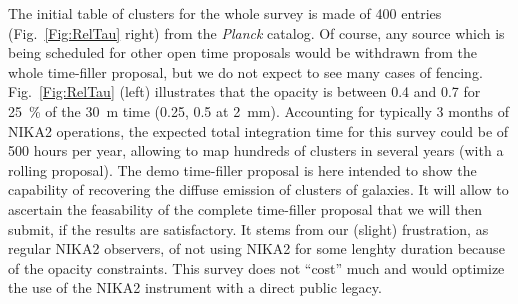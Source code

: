 \documentclass[10pt,a4paper,twoside,graphicx,color]{article}
\begin{document}
The initial table of clusters for the whole survey is made of 400
entries (Fig.~\ref{Fig:RelTau} right) from the {\sl Planck}
catalog. Of course, any source which is being scheduled for other open
time proposals would be withdrawn from the whole time-filler proposal,
but we do not expect to see many cases of fencing.
Fig.~\ref{Fig:RelTau} (left) illustrates that the opacity is between
0.4 and 0.7 for 25~\% of the 30~m time (0.25, 0.5 at 2~mm). Accounting
for typically 3 months of NIKA2 operations, the expected total
integration time for this survey could be of 500 hours per year,
allowing to map hundreds of clusters in several years (with a rolling
proposal). The demo time-filler proposal is here intended to show the
capability of recovering the diffuse emission of clusters of
galaxies. It will allow to ascertain the feasability of the complete
time-filler proposal that we will then submit, if the results are
satisfactory. It stems from our (slight) frustration, as regular NIKA2
observers, of not using NIKA2 for some lenghty duration because of the
opacity constraints. This survey does not ``cost'' much and would
optimize the use of the NIKA2 instrument with a direct public
legacy.\\
\def\aj{AJ}%
\def\actaa{Acta Astron.}%
\def\araa{ARA\&A}%
\def\apj{ApJ}%
\def\apjl{ApJ}%
\def\apjs{ApJS}%
\def\ao{Appl.~Opt.}%
\def\apss{Ap\&SS}%
\def\aap{A\&A}%
\def\aapr{A\&A~Rev.}%
\def\aaps{A\&AS}%
\def\azh{AZh}%
\def\baas{BAAS}%
\def\bac{Bull. astr. Inst. Czechosl.}%
\def\caa{Chinese Astron. Astrophys.}%
\def\cjaa{Chinese J. Astron. Astrophys.}%
\def\icarus{Icarus}%
\def\jcap{J. Cosmology Astropart. Phys.}%
\def\jrasc{JRASC}%
\def\mnras{MNRAS}%
\def\memras{MmRAS}%
\end{document}
